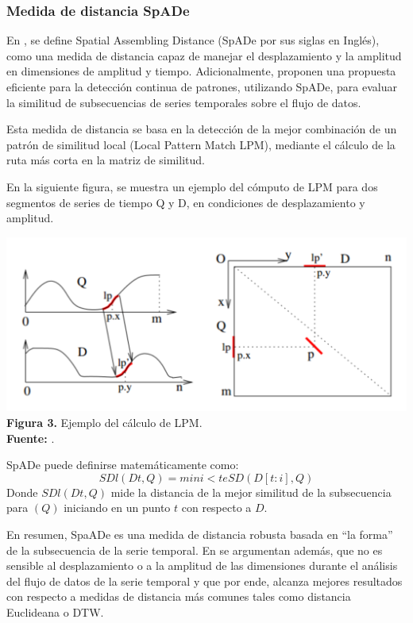 \subsubsection{\textbf{Medida de distancia SpADe}}
En \cite{spade}, se define Spatial Assembling Distance
(SpADe por sus siglas en Ingl\'es), como una medida de distancia capaz de manejar el desplazamiento y la amplitud en dimensiones de amplitud y tiempo. Adicionalmente, proponen una propuesta eficiente para la detecci\'on continua de patrones, utilizando SpADe, para evaluar la similitud de subsecuencias de series temporales sobre el flujo de datos.\par
Esta medida de distancia se basa en la detecci\'on de la mejor combinaci\'on de un patr\'on de similitud local (Local Pattern Match LPM), mediante el c\'alculo de la ruta m\'as corta en la matriz de similitud.\par 
En la siguiente figura, se muestra un ejemplo del c\'omputo de LPM para dos segmentos de series de tiempo Q y D, en condiciones de desplazamiento y amplitud.
\begin{center}
\includegraphics[scale=0.9]{spade.png}\\
\vspace*{10pt}
\footnotesize{\textbf{Figura 3.} Ejemplo del c\'alculo de LPM.}\\ \textbf{Fuente:} \cite{swale}.
\end{center}
SpADe puede definirse matem\'aticamente como:
\begin{equation}
SDl(Dt, Q) = mini<te SD(D[t : i], Q)
\end{equation}
Donde $SDl(Dt, Q)$ mide la distancia de la mejor similitud de la subsecuencia para $(Q)$ iniciando en un punto $t$ con respecto a $D$.\par
En resumen, SpaADe es una medida de distancia robusta basada en \enquote{la forma} de la subsecuencia de la serie temporal. En \cite{spade} se argumentan adem\'as, que no es sensible al desplazamiento o a la amplitud de las dimensiones durante el an\'alisis del flujo de datos de la serie temporal y que por ende, alcanza mejores resultados con respecto a medidas de distancia m\'as comunes tales como distancia Euclideana o DTW.
